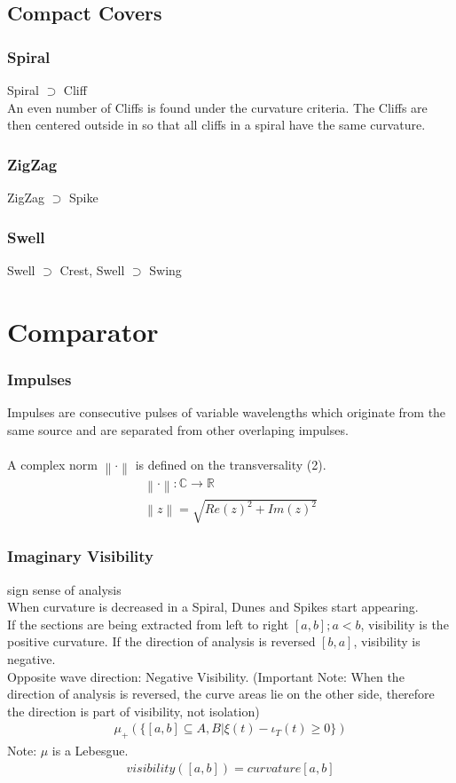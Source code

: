 \documentclass{report}
\newcommand\norm[1]{\left\lVert#1\right\rVert}
\begin{document}
\section{Compact Covers}
\subsection{Spiral}
Spiral $\supset$ Cliff\\
An even number of Cliffs is found under the curvature criteria.
The Cliffs are then centered outside in so that all cliffs in a spiral have the same curvature.
\subsection{ZigZag}
ZigZag $\supset$ Spike
\subsection{Swell}
Swell $\supset$ Crest, Swell $\supset$ Swing

\chapter{Comparator}
\subsection{Impulses}
Impulses are consecutive pulses of variable wavelengths which originate from the same source and are separated from other overlaping impulses.\\\\
A complex norm $\norm{\cdot}$ is defined on the transversality (2).
\begin{align}
\norm{\cdot} : \mathbb{C} \rightarrow \mathbb{R}\\
\norm{z} = \sqrt{Re(z)^2+Im(z)^2}
\end{align}

\subsection{Imaginary Visibility}
sign sense of analysis\\
When curvature is decreased in a Spiral, Dunes and Spikes start appearing.\\
If the sections are being extracted from left to right $[a,b];a<b$, visibility is the positive curvature. If the direction of analysis is reversed $[b,a]$, visibility is negative.\\
Opposite wave direction: Negative Visibility.
(Important Note: When the direction of analysis is reversed, the curve areas lie on the other side, therefore the direction is part of visibility, not isolation)
\begin{align}
\mu_{+}(\{[a,b] \subseteq A,B \vert \xi(t) -\iota_{T}(t)\geq0\})
\end{align}
Note: $\mu$ is a Lebesgue.
\begin{align}
visibility([a,b])=curvature[a,b]
\end{align}
\end{document}
